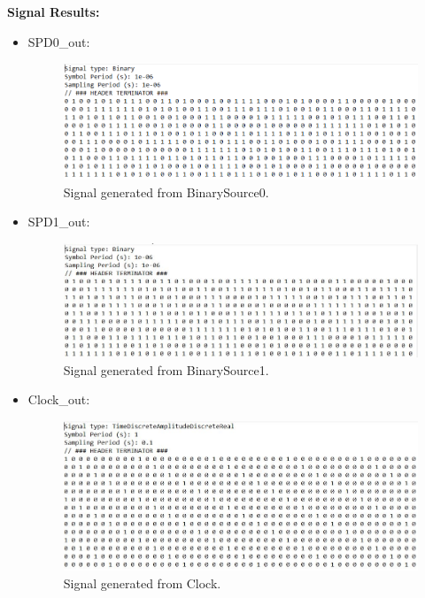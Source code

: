 \begin{refsection}
\begin{itemize}
			
		\end{itemize}


\vspace{15px}


\textbf{Signal Results:}

\begin{itemize}
	
	
	\item SPD0\_out:
	\begin{figure}[H]
		\centering
		\includegraphics[width=1\linewidth]{./sdf/arduino_quantum_rx/figures/SPD0.png}
		\caption{Signal generated from BinarySource0.}
		\label{fig:arduino}
	\end{figure}

	\item SPD1\_out:
	\begin{figure}[H]
		\centering
		\includegraphics[width=1\linewidth]{./sdf/arduino_quantum_rx/figures/SPD1.JPG}
		\caption{Signal generated from BinarySource1.}
		\label{fig:arduino}
	\end{figure}

	
	\item Clock\_out:
	\begin{figure}[H]
		\centering
		\includegraphics[width=1.1\linewidth]{./sdf/arduino_quantum_rx/figures/Clock.JPG}
		\caption{Signal generated from Clock.}
		\label{fig:arduino}
	\end{figure}
	

\end{itemize}
\end{refsection}
